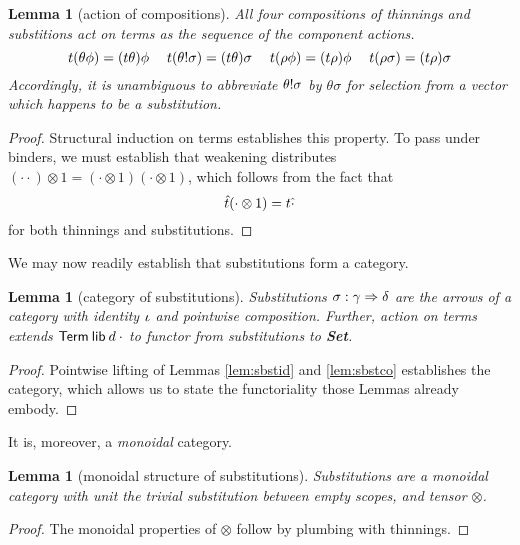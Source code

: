 \documentclass{jfp1}
\newtheorem{lemma}[theorem]{Lemma}
\newcommand{\Set}{\textbf{Set}}
\begin{document}
\begin{lemma}[action of compositions\label{lem:sbstco}]
  All four compositions of thinnings and substitions act on terms as the sequence of the
  component actions.
  \[
    t(\theta\phi) = (t\theta)\phi \quad\;
    t(\theta!\sigma) = (t\theta)\sigma \quad\;
    t(\rho\phi) = (t\rho)\phi \quad\;
    t(\rho\sigma) = (t\rho)\sigma
  \]
  Accordingly, it is unambiguous to abbreviate $\theta!\sigma$ by $\theta\sigma$ for
  selection from a vector which happens to be a substitution.
\end{lemma}
\begin{proof}
  Structural induction on terms establishes this property. To pass under binders, we must
  establish that weakening distributes $(\cdot\cdot)\otimes1 = (\cdot\otimes1)(\cdot\otimes1)$, which follows from
  the fact that
  \[
    \hat t(\cdot\otimes1) = t\hat\cdot
  \]
  for both thinnings and substitutions.
\end{proof}

We may now readily establish that substitutions form a category.

\begin{lemma}[category of substitutions]
  Substitutions $\sigma : \gamma\Rightarrow\delta$ are the arrows of a
  category with identity $\iota$ and pointwise composition.
  Further, action on terms extends $\mathsf{Term}\:\mathsf{lib}\:d\:\cdot$ to functor
  from substitutions to \Set.
\end{lemma}
\begin{proof}
  Pointwise lifting of Lemmas \ref{lem:sbstid} and \ref{lem:sbstco}
  establishes the category, which allows us to state the functoriality
  those Lemmas already embody.
\end{proof}

It is, moreover, a \emph{monoidal} category.

\begin{lemma}[monoidal structure of substitutions]
  Substitutions are a monoidal category with unit the trivial
  substitution between empty scopes, and tensor $\otimes$.
\end{lemma}
\begin{proof}
  The monoidal properties of $\otimes$ follow by plumbing with thinnings.
\end{proof}
\end{document}
